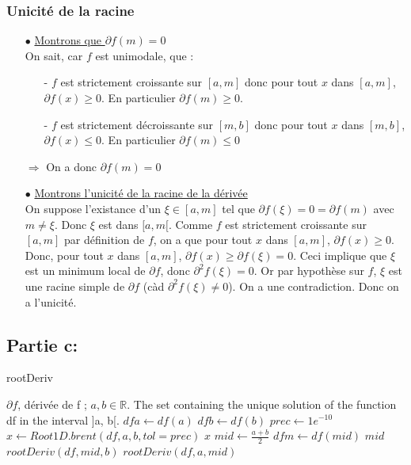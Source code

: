 \documentclass[a4paper, 12pt]{article}
\begin{document}
\subsubsection{Unicité de la racine}

\begin{itemize}
	\item[$\bullet$] \underline{Montrons que $\partial f(m) =0 $} \\
		On sait, car $f$ est unimodale, que :
		\begin{itemize}
			\item[-] $f$ est strictement croissante sur $[a,m]$ donc pour tout $x$ dans $[a,m]$, $\partial f(x) \geqslant 0$. En particulier $\partial f(m) \geqslant 0$.
			\item[-] $f$ est strictement décroissante sur $[m,b]$ donc pour tout $x$ dans $[m,b]$, $\partial f(x) \leqslant 0 $. En particulier $\partial f(m) \leqslant 0$
		\end{itemize}
		$\Rightarrow$ On a donc $\partial f(m) = 0$
	\item[$\bullet$] \underline{Montrons l'unicité de la racine de la dérivée} \\
		On suppose l'existance d'un $\xi \in [a,m]$ tel que $ \partial f(\xi) = 0 = \partial f(m)$ avec $ m \neq \xi$. Donc $\xi$ est dans $[a,m[$. Comme $f$ est strictement croissante sur $[a,m]$ par définition de $f$, on a que pour tout $x$ dans $[a,m]$, $\partial f(x) \geqslant 0$. Donc, pour tout $x$ dans $[a,m]$, $\partial f(x) \geqslant \partial f(\xi) = 0$. Ceci implique que $\xi$ est un minimum local de $\partial f$, donc $\partial^2 f(\xi) = 0$. Or par hypothèse sur $f$, $\xi$ est une racine simple de $\partial f$ (càd $\partial^2 f(\xi) \neq 0$). On a une contradiction. Donc on a l'unicité.
\end{itemize}


\newpage
\subsection{Partie c:}

\begin{algorithm}

\caption{rootDeriv}
\label{Modele pour un algo}

\begin{algorithmic}

\REQUIRE \( \partial f \), dérivée de f ; \( a, b  \in \mathbb{R} \).
\ENSURE The set containing the unique solution of the function df in the interval ]a, b[.
\STATE \( dfa \leftarrow df(a) \)
\STATE \( dfb \leftarrow df(b) \)
\STATE \( prec \leftarrow 1e^{-10} \)
	\STATE \( x \leftarrow Root1D.brent(df, a, b, tol=prec) \)
	\RETURN $x$
\ELSE
	\STATE \( mid \leftarrow \frac{a + b}{2} \)
	\STATE \( dfm \leftarrow df(mid) \)
		\RETURN $mid$
		\RETURN \( rootDeriv(df, mid, b) \)
	\ELSE
		\RETURN \( rootDeriv(df, a, mid) \)
	\ENDIF
\ENDIF

\end{algorithmic}

\end{algorithm}
\end{document}
